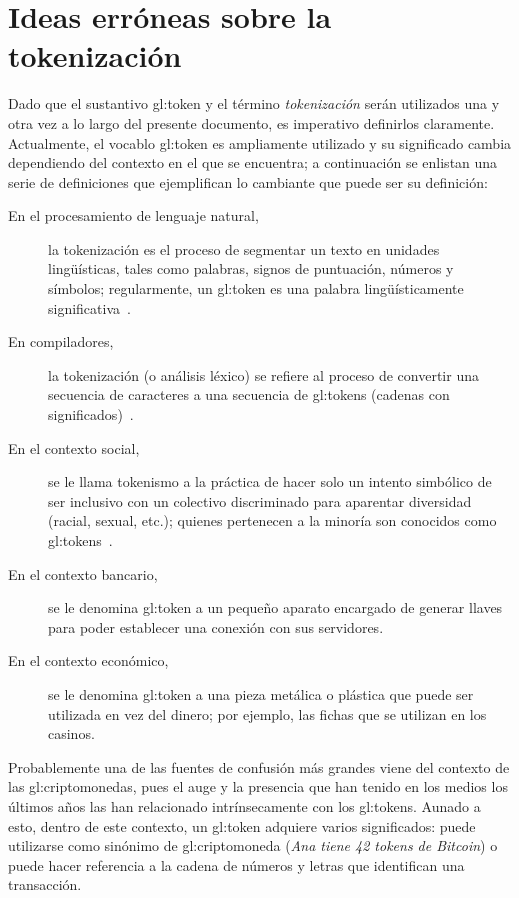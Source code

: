 %
%
%

\section{Ideas erróneas sobre la tokenización}

Dado que el sustantivo \gls{gl:token} y el término \textit{tokenización} serán
utilizados una y otra vez a lo largo del presente documento, es imperativo
definirlos claramente. Actualmente, el vocablo \gls{gl:token} es ampliamente
utilizado y su significado cambia dependiendo del contexto en el que se
encuentra; a continuación se enlistan una serie de definiciones que
ejemplifican lo cambiante que puede ser su definición:
\begin{description}
  \item [En el procesamiento de lenguaje natural,] la tokenización es el proceso
    de segmentar un texto en unidades lingüísticas, tales como palabras, signos
    de puntuación, números y símbolos; regularmente, un \gls{gl:token} es una
    palabra lingüísticamente significativa~\cite{miscon_nlp}.
  \item [En compiladores,] la tokenización (o análisis léxico) se refiere al
    proceso de convertir una secuencia de caracteres a una secuencia de
    \glspl{gl:token} (cadenas con significados)~\cite{miscon_comp}.
  \item [En el contexto social,] se le llama tokenismo a la práctica de hacer
    solo un intento simbólico de ser inclusivo con un colectivo discriminado
    para aparentar diversidad (racial, sexual, etc.); quienes pertenecen a la
    minoría son conocidos como \glspl{gl:token}~\cite{miscon_soc}.
  \item [En el contexto bancario,] se le denomina \gls{gl:token} a un pequeño
    aparato encargado de generar llaves para poder establecer una conexión con
    sus servidores.
  \item [En el contexto económico,] se le denomina \gls{gl:token} a una pieza
    metálica o plástica que puede ser utilizada en vez del dinero; por ejemplo,
    las fichas que se utilizan en los casinos.
\end{description}
Probablemente una de las fuentes de confusión más grandes viene del contexto
de las \glspl{gl:criptomoneda}, pues el auge y la presencia que han tenido en
los medios los últimos años las han relacionado intrínsecamente con los
\glspl{gl:token}. Aunado a esto, dentro de este contexto, un \gls{gl:token}
adquiere varios significados: puede utilizarse como sinónimo de
\gls{gl:criptomoneda} (\textit{Ana tiene 42 tokens de Bitcoin}) o puede hacer
referencia a la cadena de números y letras que identifican una transacción.

